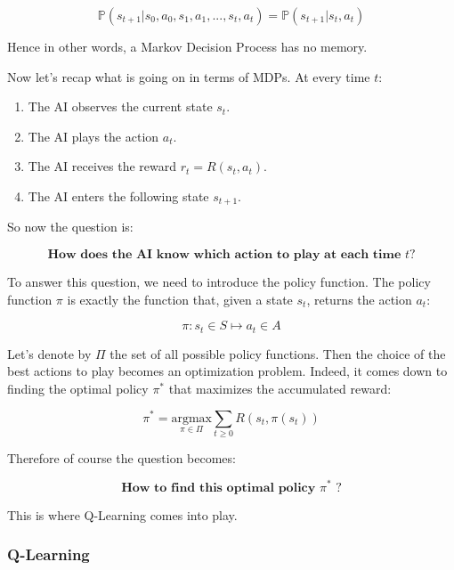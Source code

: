 \documentclass[]{book}
\begin{document}
\begin{equation*}
\mathbb{P}(s_{t+1}|s_0,a_0,s_1,a_1,...,s_t,a_t) = \mathbb{P}(s_{t+1}|s_t,a_t)
\end{equation*}

Hence in other words, a Markov Decision Process has no memory.

\newpage

Now let's recap what is going on in terms of MDPs. At every time \(t\):

\begin{enumerate}
\item The AI observes the current state $s_t$.
\item The AI plays the action $a_t$.
\item The AI receives the reward $r_t = R(s_t, a_t)$.
\item The AI enters the following state $s_{t+1}$.
\end{enumerate}

So now the question is:

\begin{equation*}
\textbf{How does the AI know which action to play at each time $t$?}
\end{equation*}

To answer this question, we need to introduce the policy function. The policy function \(\pi\) is exactly the function that, given a state \(s_t\), returns the action \(a_t\):

\begin{equation*}
\pi: s_t \in S \mapsto a_t \in A
\end{equation*}

Let's denote by \(\Pi\) the set of all possible policy functions. Then the choice of the best actions to play becomes an optimization problem. Indeed, it comes down to finding the optimal policy \(\pi^*\) that maximizes the accumulated reward:

\begin{equation*}
\pi^* = \underset{\pi \in \Pi}{\textrm{argmax}} \sum_{t \ge 0} R(s_t,\pi(s_t))
\end{equation*}

Therefore of course the question becomes:

\begin{equation*}
\textbf{How to find this optimal policy $\pi^*$ ?}
\end{equation*}

This is where Q-Learning comes into play.

\subsubsection{Q-Learning}
\end{document}

